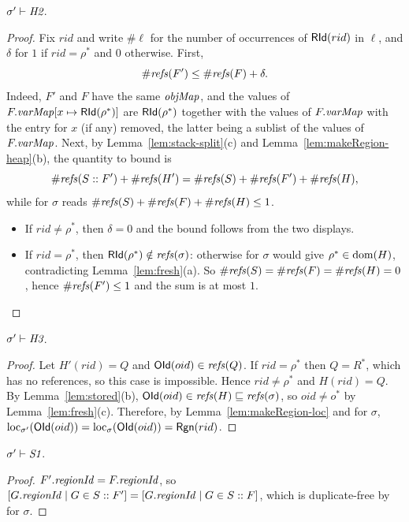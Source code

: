\begin{lemma}[\inv{H2}] 
$\sigma' \vdash \textit{H2}$.
\end{lemma}
\begin{proof}
Fix $rid$ and write $\#\ell$ for the number of occurrences of $\mathsf{RId}(rid)$ in $\ell$, and
$\delta$ for $1$ if $rid = \rho^*$ and $0$ otherwise. First,
\[ \#\mathit{refs}(F') \le \#\mathit{refs}(F) + \delta. \]
Indeed, $F'$ and $F$ have the same $\mathit{objMap}$, and the values of $F.\mathit{varMap}[x \mapsto \mathsf{RId}(\rho^*)]$ are
$\mathsf{RId}(\rho^*)$ together with the values of $F.\mathit{varMap}$ with the entry for $x$ (if any) removed, the
latter being a sublist of the values of $F.\mathit{varMap}$. Next, by Lemma~\ref{lem:stack-split}(c) and
Lemma~\ref{lem:makeRegion-heap}(b), the quantity to bound is
\[ \#\mathit{refs}(S :: F') + \#\mathit{refs}(H') = \#\mathit{refs}(S) + \#\mathit{refs}(F') + \#\mathit{refs}(H), \]
while  for $\sigma$ reads
$\#\mathit{refs}(S) + \#\mathit{refs}(F) + \#\mathit{refs}(H) \le 1$.
\begin{itemize}[nosep]
  \item If $rid \ne \rho^*$, then $\delta = 0$ and the bound follows from the two displays.
  \item If $rid = \rho^*$, then $\mathsf{RId}(\rho^*) \notin \mathit{refs}(\sigma)$: otherwise  for $\sigma$
    would give $\rho^* \in \mathrm{dom}(H)$, contradicting Lemma~\ref{lem:fresh}(a). So
    $\#\mathit{refs}(S) = \#\mathit{refs}(F) = \#\mathit{refs}(H) = 0$, hence $\#\mathit{refs}(F') \le 1$ and the sum is at most
    $1$. \qedhere
\end{itemize}
\end{proof}

\begin{lemma}[\inv{H3}] 
$\sigma' \vdash \textit{H3}$.
\end{lemma}
\begin{proof}
Let $H'(rid) = Q$ and $\mathsf{OId}(oid) \in \mathit{refs}(Q)$. If $rid = \rho^*$ then $Q = R^*$, which has no
references, so this case is impossible. Hence $rid \ne \rho^*$ and $H(rid) = Q$. By
Lemma~\ref{lem:stored}(b), $\mathsf{OId}(oid) \in \mathit{refs}(H) \sqsubseteq \mathit{refs}(\sigma)$, so $oid \ne o^*$ by
Lemma~\ref{lem:fresh}(c). Therefore, by Lemma~\ref{lem:makeRegion-loc} and  for $\sigma$,
$\mathrm{loc}_{\sigma'}(\mathsf{OId}(oid)) = \mathrm{loc}_{\sigma}(\mathsf{OId}(oid)) = \mathsf{Rgn}(rid)$.
\end{proof}

\begin{lemma}[\inv{S1}] 
$\sigma' \vdash \textit{S1}$.
\end{lemma}
\begin{proof}
$F'.\mathit{regionId} = F.\mathit{regionId}$, so $[G.\mathit{regionId} \mid G \in S :: F'] = [G.\mathit{regionId} \mid G \in S :: F]$, which is
duplicate-free by  for $\sigma$.
\end{proof}

